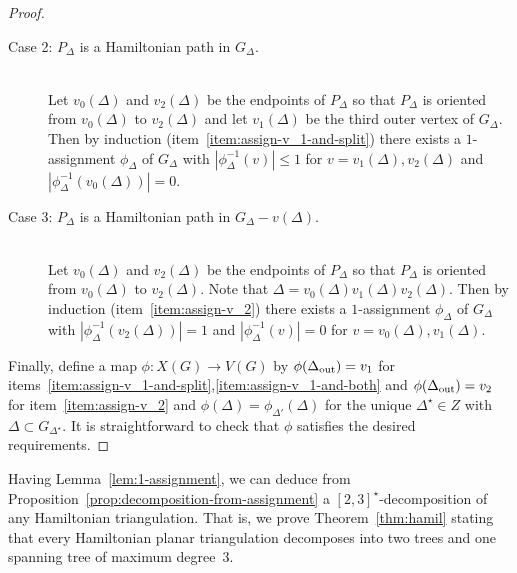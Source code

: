 \documentclass[a4paper,10pt]{article}
\theoremstyle{plain}
\begin{document}
\begin{proof}
\begin{description}
  \item[Case 2: $P_\Delta$ is a Hamiltonian path in $G_\Delta$.]{\ \\}
   Let $v_0(\Delta)$ and $v_2(\Delta)$ be the endpoints of $P_\Delta$ so that $P_\Delta$ is oriented from $v_0(\Delta)$ to $v_2(\Delta)$ and let $v_1(\Delta)$ be the third outer vertex of $G_\Delta$.
   Then by induction (item~\ref{item:assign-v_1-and-split}) there exists a $1$-assignment $\phi_\Delta$ of $G_\Delta$ with $|\phi_\Delta^{-1}(v)| \leq 1$ for $v = v_1(\Delta),v_2(\Delta)$ and $|\phi_\Delta^{-1}(v_0(\Delta))| = 0$.
   
  \item[Case 3: $P_\Delta$ is a Hamiltonian path in $G_\Delta - v(\Delta)$.]{\ \\}
   Let $v_0(\Delta)$ and $v_2(\Delta)$ be the endpoints of $P_\Delta$ so that $P_\Delta$ is oriented from $v_0(\Delta)$ to $v_2(\Delta)$.
   Note that $\Delta = v_0(\Delta)v_1(\Delta)v_2(\Delta)$.
   Then by induction (item~\ref{item:assign-v_2}) there exists a $1$-assignment $\phi_\Delta$ of $G_\Delta$ with $|\phi_\Delta^{-1}(v_2(\Delta))| = 1$ and $|\phi_\Delta^{-1}(v)| = 0$ for $v = v_0(\Delta),v_1(\Delta)$.
 \end{description}

 Finally, define a map $\phi : X(G) \to V(G)$ by $\phi(\Delta_{\rm out}) = v_1$ for items~\ref{item:assign-v_1-and-split},\ref{item:assign-v_1-and-both} and $\phi(\Delta_{\rm out}) = v_2$ for item~\ref{item:assign-v_2} and $\phi(\Delta) = \phi_{\Delta'}(\Delta)$ for the unique $\Delta^\star \in Z$ with $\Delta \subset G_{\Delta^\star}$.
 It is straightforward to check that $\phi$ satisfies the desired requirements.
\end{proof}

Having Lemma~\ref{lem:1-assignment}, we can deduce from Proposition~\ref{prop:decomposition-from-assignment} a $[2,3]^\star$-decomposition of any Hamiltonian triangulation.
That is, we prove Theorem~\ref{thm:hamil} stating that every Hamiltonian planar triangulation decomposes into two trees and one spanning tree of maximum degree~$3$.
\end{document}
